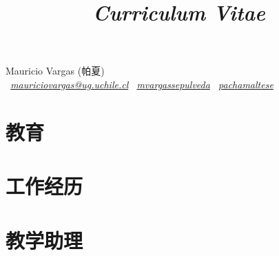 \documentclass[11pt,a4paper]{moderncv}
\title{\emph{Curriculum Vitae}}
\begin{document}


\begin{center}
\Huge{Mauricio Vargas (帕夏)}\\ \normalsize
\vspace{3mm}
\emph{
\faEnvelope\ \emph{\href{mailto:mauriciovargas@ug.uchile.cl}{mauriciovargas@ug.uchile.cl}}
\hspace{3mm} 
\faLinkedin\ \emph{\href{https://cl.linkedin.com/in/mvargassepulveda}{mvargassepulveda}}
\hspace{3mm} 
\faGithub\  \emph{\href{http://github.com/pachamaltese}{pachamaltese}}}
\vspace{3mm}
\end{center}

\section{教育}

\section{工作经历}






\section{教学助理}
\end{document}
